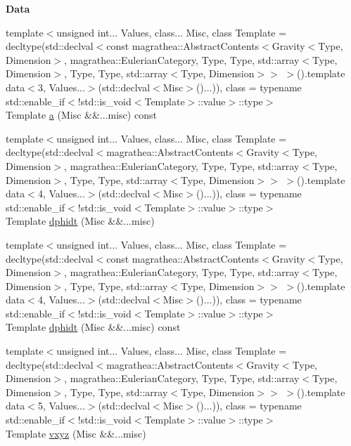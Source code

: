 \begin{Indent}{\bf Data}
\begin{DoxyCompactItemize}
\item 
{\footnotesize template$<$unsigned int... Values, class... Misc, class Template  = decltype(std\-::declval$<$const magrathea\-::\-Abstract\-Contents$<$\-Gravity$<$\-Type, Dimension$>$, magrathea\-::\-Eulerian\-Category, Type, Type, std\-::array$<$\-Type, Dimension$>$, Type, Type, std\-::array$<$\-Type, Dimension$>$$>$ $>$().\-template data$<$3, Values...$>$(std\-::declval$<$\-Misc$>$()...)), class  = typename std\-::enable\-\_\-if$<$!std\-::is\-\_\-void$<$\-Template$>$\-::value$>$\-::type$>$ }\\Template \hyperlink{exceptionGravity_a9e897f71820d3078589ea9738129a297}{a} (Misc \&\&...misc) const 
\item 
{\footnotesize template$<$unsigned int... Values, class... Misc, class Template  = decltype(std\-::declval$<$magrathea\-::\-Abstract\-Contents$<$\-Gravity$<$\-Type, Dimension$>$, magrathea\-::\-Eulerian\-Category, Type, Type, std\-::array$<$\-Type, Dimension$>$, Type, Type, std\-::array$<$\-Type, Dimension$>$$>$ $>$().\-template data$<$4, Values...$>$(std\-::declval$<$\-Misc$>$()...)), class  = typename std\-::enable\-\_\-if$<$!std\-::is\-\_\-void$<$\-Template$>$\-::value$>$\-::type$>$ }\\Template \hyperlink{exceptionGravity_ae6ba904e0f30f22fa39097c1c45608db}{dphidt} (Misc \&\&...misc)
\item 
{\footnotesize template$<$unsigned int... Values, class... Misc, class Template  = decltype(std\-::declval$<$const magrathea\-::\-Abstract\-Contents$<$\-Gravity$<$\-Type, Dimension$>$, magrathea\-::\-Eulerian\-Category, Type, Type, std\-::array$<$\-Type, Dimension$>$, Type, Type, std\-::array$<$\-Type, Dimension$>$$>$ $>$().\-template data$<$4, Values...$>$(std\-::declval$<$\-Misc$>$()...)), class  = typename std\-::enable\-\_\-if$<$!std\-::is\-\_\-void$<$\-Template$>$\-::value$>$\-::type$>$ }\\Template \hyperlink{exceptionGravity_a2e8404f5cd0be7af0ab9f227a4bb1bb5}{dphidt} (Misc \&\&...misc) const 
\item 
{\footnotesize template$<$unsigned int... Values, class... Misc, class Template  = decltype(std\-::declval$<$magrathea\-::\-Abstract\-Contents$<$\-Gravity$<$\-Type, Dimension$>$, magrathea\-::\-Eulerian\-Category, Type, Type, std\-::array$<$\-Type, Dimension$>$, Type, Type, std\-::array$<$\-Type, Dimension$>$$>$ $>$().\-template data$<$5, Values...$>$(std\-::declval$<$\-Misc$>$()...)), class  = typename std\-::enable\-\_\-if$<$!std\-::is\-\_\-void$<$\-Template$>$\-::value$>$\-::type$>$ }\\Template \hyperlink{exceptionGravity_a1253c513939ee58103a278706bb2c3e4}{vxyz} (Misc \&\&...misc)

\end{DoxyCompactItemize}
\end{Indent}
